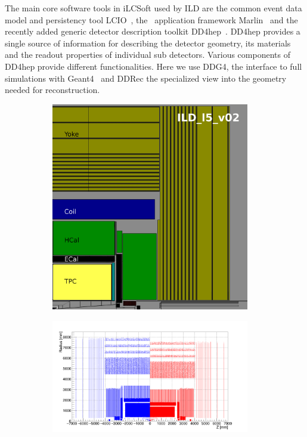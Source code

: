 The main core software tools in iLCSoft used by ILD are the common event data model and persistency tool LCIO~\cite{Gaede:2003ip},
the \CPP\ application framework Marlin~\cite{Gaede:2006pj} and the recently added generic detector description toolkit
DD4hep~\cite{Frank:2014zya,Frank:2015ivo}. DD4hep provides a single source of information for describing the detector geometry, its
materials and the readout properties of individual sub detectors. Various components of DD4hep provide different functionalities.
Here we use DDG4, the interface to full simulations with Geant4~\cite{Agostinelli:2002hh} and DDRec the specialized view into the
geometry needed for reconstruction.
%
%
\begin{figure}[t!]
  \begin{subfigure}{0.40\hsize}
    \includegraphics[width=0.95\textwidth]{Modelling/fig/ILD_l5_v02_sideview_gimp_2.jpg}
    \caption{ \label{fig:sim_model_quad}}
  \end{subfigure}
  \begin{subfigure}{0.60\hsize}
    \includegraphics[width=0.95\textwidth]{Modelling/fig/hits_rz_small_large_ILD.png}

\end{subfigure}
\end{figure}
